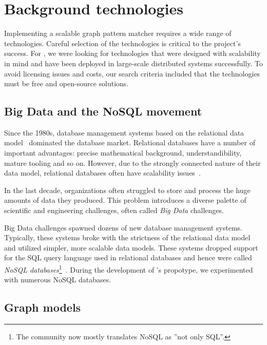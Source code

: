 \chapter{Background technologies}

Implementing a scalable graph pattern matcher requires a wide range of technologies. Careful selection of the technologies is critical to the project's success. For \iqd, we were looking for technologies that were designed with scalability in mind and have been deployed in large-scale distributed systems successfully. To avoid licensing issues and costs, our search criteria included that the technologies must be free and open-source solutions. 


\section{Big Data and the NoSQL movement}

Since the 1980s, database management systems based on the relational data model~\cite{Codd:1970:RMD:362384.362685} dominated the database market. Relational databases have a number of important advantages: precise mathematical background, understandibility, mature tooling and so on. However, due to the strongly connected nature of their data model, relational databases often have scalability issues~\cite{Sakr13}. %

In the last decade, organizations often struggled to store and process the huge amounts of data they produced. This problem introduces a diverse palette of scientific and engineering challenges, often called \emph{Big Data} challenges. 

Big Data challenges spawned dozens of new database management systems. Typically, these systems broke with the strictness of the relational data model and utilized simpler, more scalable data models. These systems dropped support for the SQL query language used in relational databases and hence were called \emph{NoSQL databases}\footnote{The community now mostly translates NoSQL as ''not only SQL''.}~\cite{NoSQL}. During the development of \iqd's propotype, we experimented with numerous NoSQL databases.

\section{Graph models}

